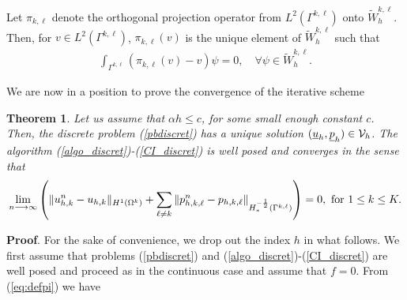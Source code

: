 \documentclass[final]{siamltex}
\newtheorem{theo}{Theorem}
\begin{document}
Let $\pi_{k,\ell}$ denote the orthogonal projection operator from
$L^2(\Gamma^{k,\ell})$
onto $\tilde W_h^{k,\ell}$. Then, for $v \in L^2(\Gamma^{k,\ell})$,
$\pi_{k,\ell}(v)$ is the unique element of $\tilde W_h^{k,\ell}$
such that
\begin{eqnarray}\label{eq:defpi}
\int_{\Gamma^{k,\ell}} (\pi_{k,\ell}(v)-v)\psi=0, \quad \forall \psi \in
\tilde W_h^{k,\ell}.
\end{eqnarray}

We are now in a position to prove the convergence of the iterative scheme

\begin{theo}\label{theo2}
Let us assume that $\alpha h \le c$, for some small enough constant $c$.
Then, the discrete problem (\ref{pbdiscret}) has a unique solution
$({{\underline u}}_h,{{\underline p}}_h) \in {\cal V}_h$.
The algorithm (\ref{algo_discret})-(\ref{CI_discret}) is well posed and
converges
in the sense that
\begin{eqnarray}
\lim_{n \longrightarrow \infty} \left( \|u_{h,k}^n - u_{h,k}\|_{H^1(\Omega^k)}
+ \sum_{\ell\neq k} \|p_{h,k,\ell}^n-p_{h,k,\ell}\|_{H^{-{1\over
2}}_*(\Gamma^{k,\ell})} \right)=0,
\mbox{  for } 1\le k\le K. \nonumber
\end{eqnarray}
\end{theo}
{\bf Proof}. For the sake of convenience, we drop out the index $h$ in what
follows.
We first assume that problems (\ref{pbdiscret}) and
(\ref{algo_discret})-(\ref{CI_discret}) are well posed and
proceed as in the continuous case and assume that $f=0$.
From (\ref{eq:defpi}) we have
\end{document}
